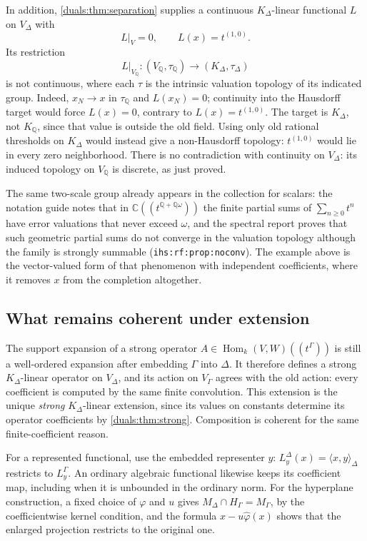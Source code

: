\documentclass[11pt,letterpaper]{article}
\numberwithin{equation}{section}
\theoremstyle{definition}
\theoremstyle{remark}
\newcommand{\C}{\mathbb C}
\newcommand{\Q}{\mathbb Q}
\newcommand{\Hom}{\operatorname{Hom}}
\newcommand{\ip}[2]{\langle#1,#2\rangle}
\newcommand{\ihs}[1]{\texttt{ihs:#1}}
\begin{document}
In addition, \cref{duals:thm:separation} supplies a continuous
$K_\Delta$-linear functional $L$ on $V_\Delta$ with
\[
 L|_V=0,\qquad L(x)=t^{(1,0)}.
\]
Its restriction
\[
 L|_{V_\Q}:(V_\Q,\tau_\Q)\longrightarrow(K_\Delta,\tau_\Delta)
\]
is not continuous, where each $\tau$ is the intrinsic valuation
topology of its indicated group. Indeed, $x_N\to x$ in $\tau_\Q$
and $L(x_N)=0$; continuity into the Hausdorff target would force
$L(x)=0$, contrary to $L(x)=t^{(1,0)}$. The target is $K_\Delta$,
not $K_\Q$, since that value is outside the old field. Using only
old rational thresholds on $K_\Delta$ would instead give a
non-Hausdorff topology: $t^{(1,0)}$ would lie in every zero neighborhood.
There is no contradiction with continuity on $V_\Delta$: its induced
topology on $V_\Q$ is discrete, as just proved.

The same two-scale group already appears in the collection for scalars:
the notation guide notes that in $\C((t^{\Q+\Q\omega}))$ the finite
partial sums of $\sum_{n\ge0}t^n$ have error valuations that never exceed
$\omega$, and the spectral report proves that such geometric partial sums
do not converge in the valuation topology although the family is strongly
summable (\ihs{rf:prop:noconv}). The example above is the vector-valued
form of that phenomenon with independent coefficients, where it removes
$x$ from the completion altogether.

\subsection{What remains coherent under extension}
The support expansion of a strong operator
$A\in\Hom_k(V,W)((t^\Gamma))$ is still a well-ordered expansion
after embedding $\Gamma$ into $\Delta$. It therefore defines a
strong $K_\Delta$-linear operator on $V_\Delta$, and its action on
$V_\Gamma$ agrees with the old action: every coefficient is computed
by the same finite convolution. This extension is the unique
\emph{strong} $K_\Delta$-linear extension, since its values on constants
determine its operator coefficients by \cref{duals:thm:strong}.
Composition is coherent for the same finite-coefficient reason.

For a represented functional, use the embedded representer $y$:
$L_y^\Delta(x)=\ip{x}{y}_\Delta$ restricts to $L_y^\Gamma$.
An ordinary algebraic functional likewise keeps its coefficient map,
including when it is unbounded in the ordinary norm. For the
hyperplane construction, a fixed choice of $\varphi$ and $u$ gives
$M_\Delta\cap H_\Gamma=M_\Gamma$, by the coefficientwise kernel
condition, and the formula $x-u\widehat\varphi(x)$ shows that the
enlarged projection restricts to the original one.
\end{document}
